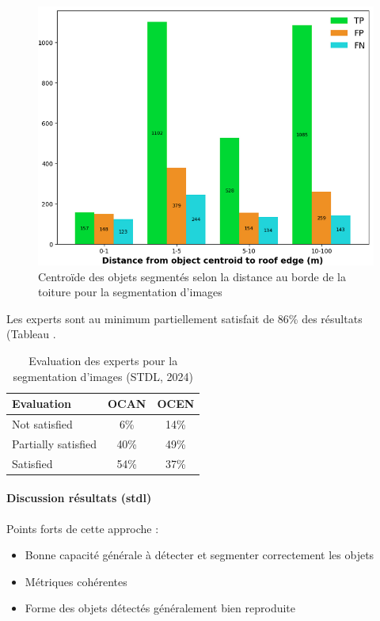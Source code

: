 \begin{figure}[H]
    \centering
    \includegraphics[width=1\linewidth]{02-main//figures/ch2/stdl_11_segmentation_image_distance.png}
    \caption{Centroïde des objets segmentés selon la distance au borde de la toiture pour la segmentation d’images  \cite{herny_detection_2024}}
    \label{fig:stdl_11_segmentation_image_distance}
\end{figure}

\par{Les experts sont au minimum partiellement satisfait de 86\% des résultats (Tableau .}
\begin{table}[h]
    \centering
    \begin{tabular}{|l|c|c|}
    \hline
    Evaluation & OCAN & OCEN \\
    \hline
    Not satisfied & 6\% & 14\% \\
    Partially satisfied & 40\% & 49\% \\
    Satisfied & 54\% & 37\% \\
    \hline
    \end{tabular}
    \caption{Evaluation des experts pour la segmentation d'images (STDL, 2024)}
    \label{tab:stdl_07_segmentation_image_resultats_experts}
\end{table}
\newpage
\paragraph{Discussion résultats (\acrshort{stdl})}

\par{Points forts de cette approche :}
\begin{itemize}
\item Bonne capacité générale à détecter et segmenter correctement les objets
\item Métriques cohérentes
\item Forme des objets détectés généralement bien reproduite
\end{itemize}


